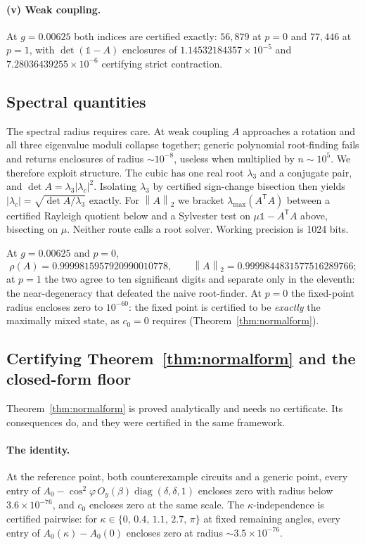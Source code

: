 \documentclass[11pt,a4paper]{article}
\theoremstyle{definition}
\theoremstyle{remark}
\DeclareMathOperator{\diag}{diag}
\newcommand{\I}{\mathbb{1}}
\newcommand{\opn}[1]{\left\lVert #1 \right\rVert_{2}}
\begin{document}
\paragraph{(v) Weak coupling.} At $g = 0.00625$ both indices are certified exactly: $56{,}879$ at $p=0$ and $77{,}446$ at $p=1$, with $\det(\I-A)$ enclosures of $1.14532184357\times10^{-5}$ and $7.28036439255\times10^{-6}$ certifying strict contraction.

\subsection{Spectral quantities}

The spectral radius requires care. At weak coupling $A$ approaches a rotation and all three eigenvalue moduli collapse together; generic polynomial root-finding fails and returns enclosures of radius $\sim10^{-8}$, useless when multiplied by $n \sim 10^{5}$. We therefore exploit structure. The cubic has one real root $\lambda_3$ and a conjugate pair, and $\det A = \lambda_3|\lambda_c|^2$. Isolating $\lambda_3$ by certified sign-change bisection then yields $|\lambda_c| = \sqrt{\det A/\lambda_3}$ exactly. For $\opn{A}$ we bracket $\lambda_{\max}(A^{\mathsf T}A)$ between a certified Rayleigh quotient below and a Sylvester test on $\mu\I - A^{\mathsf T}A$ above, bisecting on $\mu$. Neither route calls a root solver. Working precision is 1024 bits.

At $g = 0.00625$ and $p=0$,
\[
  \rho(A) = 0.9999815957920990010778, \qquad \opn{A} = 0.9999844831577516289766;
\]
at $p=1$ the two agree to ten significant digits and separate only in the eleventh: the near-degeneracy that defeated the naive root-finder. At $p=0$ the fixed-point radius encloses zero to $10^{-60}$: the fixed point is certified to be \emph{exactly} the maximally mixed state, as $c_0 = 0$ requires (Theorem~\ref{thm:normalform}).

\subsection{Certifying Theorem~\ref{thm:normalform} and the closed-form floor}\label{sec:certthm3}

Theorem~\ref{thm:normalform} is proved analytically and needs no certificate. Its consequences do, and they were certified in the same framework.

\paragraph{The identity.} At the reference point, both counterexample circuits and a generic point, every entry of $A_0 - \cos^2\!\varphi\,O_y(\beta)\diag(\delta,\delta,1)$ encloses zero with radius below $3.6\times10^{-76}$, and $c_0$ encloses zero at the same scale. The $\kappa$-independence is certified pairwise: for $\kappa \in \{0,\,0.4,\,1.1,\,2.7,\,\pi\}$ at fixed remaining angles, every entry of $A_0(\kappa) - A_0(0)$ encloses zero at radius $\sim3.5\times10^{-76}$.
\end{document}
